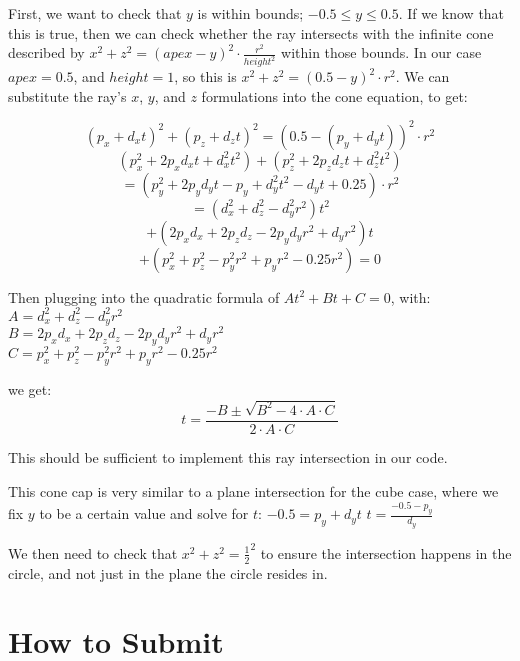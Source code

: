\documentclass[10pt,twocolumn]{article}
\begin{document}
\begin{framed}
First, we want to check that $y$ is within bounds; $-0.5 \leq y \leq 0.5$. If we know that this is true, then we can check whether the ray intersects with the infinite cone described by $x^2 + z^2 = (apex - y)^2 \cdot \frac{r^2}{height^2}$ within those bounds. In our case $apex = 0.5$, and $height = 1$, so this is $x^2 + z^2 = (0.5 - y)^2 \cdot r^2$. We can substitute the ray's $x$, $y$, and $z$ formulations into the cone equation, to get:

\[(p_x + d_x t)^2 + (p_z + d_z t)^2 = (0.5 - (p_y + d_y t))^2 \cdot r^2\]
\[(p_x^2 + 2 p_x d_x t + d_x^2 t^2) + (p_z^2 + 2 p_z d_z t + d_z^2 t^2) \]\[= (p_y^2 + 2 p_y d_y t - p_y + d_y^2 t^2 - d_y t + 0.25) \cdot r^2\]
\[= (d_x^2 + d_z^2 - d_y^2 r^2) t^2 \]\[+ (2p_xd_x + 2p_z d_z - 2p_yd_y r^2 + d_y r^2) t \]\[+ (p_x^2 + p_z^2 - p_y^2 r^2 + p_y r^2 - 0.25r^2) = 0 \]

Then plugging into the quadratic formula of $At^2 + Bt + C = 0$, with:\\ $A = d_x^2 + d_z^2 - d_y^2 r^2$\\$B = 2p_xd_x + 2p_z d_z - 2p_yd_y r^2 + d_y r^2$\\ $C = p_x^2 + p_z^2 - p_y^2 r^2 + p_y r^2 - 0.25r^2$

we get:
\[t = \frac{-B \pm \sqrt{B^2 - 4 \cdot A \cdot C}}{2 \cdot A \cdot C}\]

This should be sufficient to implement this ray intersection in our code.%


\end{framed}
\begin{framed}
This cone cap is very similar to a plane intersection for the cube case, where we fix $y$ to be a certain value and solve for $t$:
$-0.5 = p_y + d_y t$
$t = \frac{-0.5 - p_y}{d_y}$

We then need to check that $x^2 + z^2 = \frac{1}{2}^2$ to ensure the intersection happens in the circle, and not just in the plane the circle resides in.

\end{framed}

\section{How to Submit}
\end{document}

